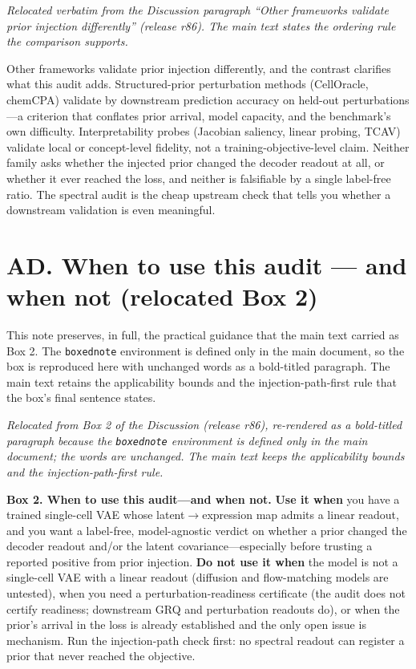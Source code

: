 \documentclass[11 pt,a4 paper]{article}
\begin{document}
\noindent\emph{Relocated verbatim from the Discussion paragraph ``Other frameworks validate prior injection differently'' (release r86). The main text states the ordering rule the comparison supports.}

Other frameworks validate prior injection differently, and the contrast clarifies what this audit adds. Structured-prior perturbation methods (CellOracle, chemCPA) validate by downstream prediction accuracy on held-out perturbations---a criterion that conflates prior arrival, model capacity, and the benchmark's own difficulty. Interpretability probes (Jacobian saliency, linear probing, TCAV) validate local or concept-level fidelity, not a training-objective-level claim. Neither family asks whether the injected prior changed the decoder readout at all, or whether it ever reached the loss, and neither is falsifiable by a single label-free ratio. The spectral audit is the cheap upstream check that tells you whether a downstream validation is even meaningful.

\clearpage

\section*{AD. When to use this audit --- and when not (relocated Box 2)}

This note preserves, in full, the practical guidance that the main text carried as Box 2. The
\texttt{boxednote} environment is defined only in the main document, so the box is reproduced
here with unchanged words as a bold-titled paragraph. The main text retains the applicability
bounds and the injection-path-first rule that the box's final sentence states.

\noindent\emph{Relocated from Box 2 of the Discussion (release r86), re-rendered as a bold-titled paragraph because the \texttt{boxednote} environment is defined only in the main document; the words are unchanged. The main text keeps the applicability bounds and the injection-path-first rule.}

\noindent\textbf{Box 2. When to use this audit---and when not.}
\textbf{Use it when} you have a trained single-cell VAE whose latent$\to$expression map admits a linear readout, and you want a label-free, model-agnostic verdict on whether a prior changed the decoder readout and/or the latent covariance---especially before trusting a reported positive from prior injection. \textbf{Do not use it when} the model is not a single-cell VAE with a linear readout (diffusion and flow-matching models are untested), when you need a perturbation-readiness certificate (the audit does not certify readiness; downstream GRQ and perturbation readouts do), or when the prior's arrival in the loss is already established and the only open issue is mechanism. Run the injection-path check first: no spectral readout can register a prior that never reached the objective.
\end{document}
